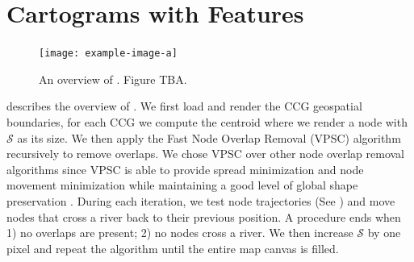 \section{Cartograms with Features}

{
\begin{figure}[b!]
    \centering
    \texttt{[image: example-image-a]}
    \caption{An overview of \software. Figure TBA.}
    \label{fig:overview}
\end{figure}
}

 describes the overview of \software. We first load and render the CCG geospatial boundaries, for each CCG we compute the centroid where we render a node with $ \mathcal{S} $ as its size. We then apply the Fast Node Overlap Removal (VPSC) algorithm \cite{dwyer2006fast} recursively to remove overlaps. We chose VPSC over other node overlap removal algorithms since VPSC is able to provide spread minimization and node movement minimization while maintaining a good level of global shape preservation \cite{chen2020Node}. During each iteration, we test node trajectories (See ) and move nodes that cross a river back to their previous position. A procedure ends when 1) no overlaps are present; 2) no nodes cross a river. We then increase $ \mathcal{S} $ by one pixel and repeat the algorithm until the entire map canvas is filled.


